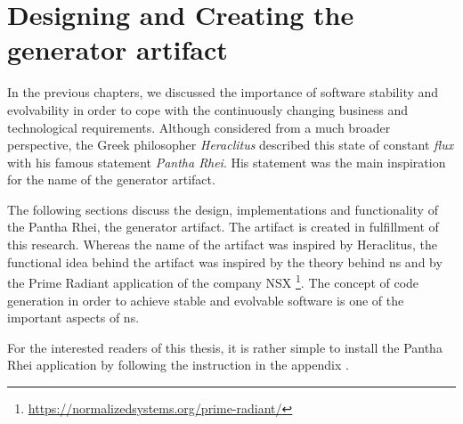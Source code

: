 \section{Designing and Creating the generator artifact} \label{sec_generator_artifact}

In the previous chapters, we discussed the importance of software stability and
evolvability in order to cope with the continuously changing business and technological
requirements. Although considered from a much broader perspective, the Greek philosopher
\emph{Heraclitus} described this state of constant \emph{flux} with his famous statement
\emph{Pantha Rhei}. His statement was the main inspiration for the name of the generator
artifact.

The following sections discuss the design, implementations and functionality of the Pantha
Rhei, the generator artifact. The artifact is created in fulfillment of this research.
Whereas the name of the artifact was inspired by Heraclitus, the functional idea behind
the artifact was inspired by the theory behind \gls{ns} and by the Prime Radiant
application of the company NSX
\footnote{\url{https://normalizedsystems.org/prime-radiant/}}. The concept of code
generation in order to achieve stable and evolvable software is one of the important aspects
of \gls{ns}.

For the interested readers of this thesis, it is rather simple to install the Pantha Rhei
application by following the instruction in the appendix
.








